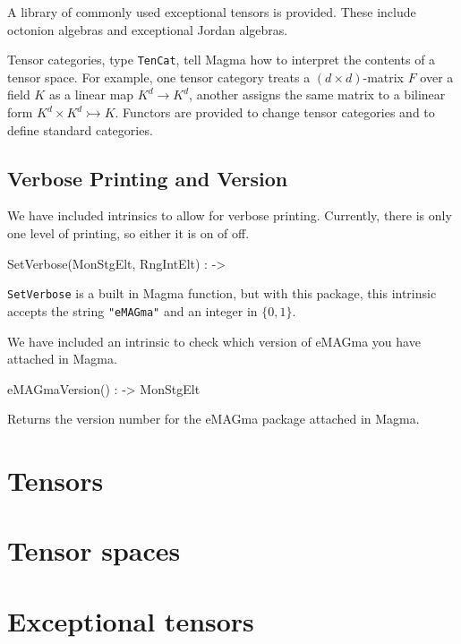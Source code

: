 \documentclass{documentation}
\begin{document}
A library of commonly used exceptional tensors is provided.
These include octonion algebras and exceptional Jordan algebras.
 
Tensor categories, type {\tt TenCat}, tell Magma how to interpret the
contents of a tensor space.  For example, one tensor category treats a 
$(d\times d)$-matrix $F$ over a field $K$ as a linear map $K^d\to K^d$,
another assigns the same matrix to a bilinear form 
$K^d\times K^d\rightarrowtail K$.  Functors are provided to change
tensor categories and to define standard categories.  

\section{Verbose Printing and Version}

We have included intrinsics to allow for verbose printing. 
Currently, there is only one level of printing, so either it is on of off. 

\begin{intrinsics}
SetVerbose(MonStgElt, RngIntElt) : -> 
\end{intrinsics}

{\tt SetVerbose} is a built in Magma function, but with this package, this intrinsic accepts the string {\tt "eMAGma"} and an integer in $\{0,1\}$. 

We have included an intrinsic to check which version of eMAGma you have attached in Magma.

\begin{intrinsics}
eMAGmaVersion() : -> MonStgElt
\end{intrinsics}

Returns the version number for the eMAGma package attached in Magma.

\chapter{Tensors}




\chapter{Tensor spaces}



\chapter{Exceptional tensors}
\end{document}
